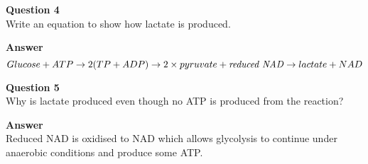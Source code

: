 \documentclass{article}
\begin{document}
\textbf{Question 4}\\
Write an equation to show how lactate is produced.

\textbf{Answer}\\
\[
	Glucose + ATP \rightarrow 2(TP + ADP) \rightarrow 2 \times pyruvate +
	\textrm{\textit{reduced NAD}} \rightarrow lactate + NAD
\]

\textbf{Question 5}\\
Why is lactate produced even though no ATP is produced from the reaction?

\textbf{Answer}\\
Reduced NAD is oxidised to NAD which allows glycolysis to continue under
anaerobic conditions and produce some ATP.
\end{document}
